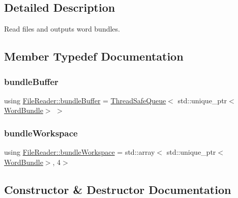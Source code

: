 \subsection{Detailed Description}
Read files and outputs word bundles. 

\subsection{Member Typedef Documentation}
\mbox{\label{class_file_reader_ac755c1e271610c2c12a7fc5b55cc048b}} 
\subsubsection{\texorpdfstring{bundle\+Buffer}{bundleBuffer}}
{\footnotesize\ttfamily using \hyperlink{class_file_reader_ac755c1e271610c2c12a7fc5b55cc048b}{File\+Reader\+::bundle\+Buffer} =  \hyperlink{class_thread_safe_queue}{Thread\+Safe\+Queue}$<$ std\+::unique\+\_\+ptr$<$\hyperlink{class_word_bundle}{Word\+Bundle}$>$ $>$\hspace{0.3cm}{\ttfamily [private]}}

\mbox{\label{class_file_reader_a7fb625dc45cee3256d37cc19c65cad86}} 
\subsubsection{\texorpdfstring{bundle\+Workspace}{bundleWorkspace}}
{\footnotesize\ttfamily using \hyperlink{class_file_reader_a7fb625dc45cee3256d37cc19c65cad86}{File\+Reader\+::bundle\+Workspace} =  std\+::array$<$ std\+::unique\+\_\+ptr$<$\hyperlink{class_word_bundle}{Word\+Bundle}$>$, 4$>$\hspace{0.3cm}{\ttfamily [private]}}



\subsection{Constructor \& Destructor Documentation}
\mbox{\label{class_file_reader_af7f6550dfccc640680792a51d997adca}} 
